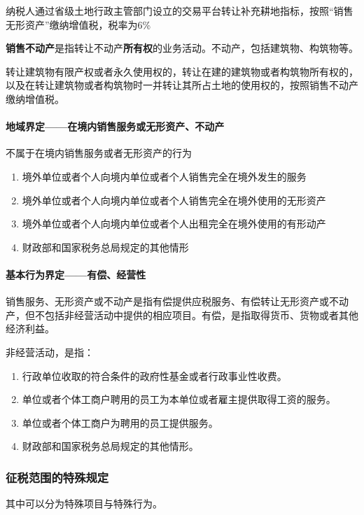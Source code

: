 \documentclass[UTF8,12pt]{ctexart}
\numberwithin{equation}{section} %
\numberwithin{figure}{section}
\numberwithin{table}{section}
\begin{document}
	纳税人通过省级土地行政主管部门设立的交易平台转让补充耕地指标，按照“销售无形资产”缴纳增值税，税率为6\%
	
	
	\textbf{销售不动产}是指转让不动产\textbf{所有权}的业务活动。不动产，包括建筑物、构筑物等。
	
	转让建筑物有限产权或者永久使用权的，转让在建的建筑物或者构筑物所有权的，以及在转让建筑物或者构筑物时一并转让其所占土地的使用权的，按照销售不动产缴纳增值税。
	
	\paragraph{地域界定——在境内销售服务或无形资产、不动产}
	不属于在境内销售服务或者无形资产的行为
	\begin{enumerate}
		\item 境外单位或者个人向境内单位或者个人销售完全在境外发生的服务
		
		\item 境外单位或者个人向境内单位或者个人销售完全在境外使用的无形资产
		
		\item 境外单位或者个人向境内单位或者个人出租完全在境外使用的有形动产
		
		\item 财政部和国家税务总局规定的其他情形
	\end{enumerate}
	
	
	\paragraph{基本行为界定——有偿、经营性}
	销售服务、无形资产或不动产是指有偿提供应税服务、有偿转让无形资产或不动产，但不包括非经营活动中提供的相应项目。有偿，是指取得货币、货物或者其他经济利益。
	
	非经营活动，是指：
	\begin{enumerate}
		\item 行政单位收取的符合条件的政府性基金或者行政事业性收费。
		
		\item 单位或者个体工商户聘用的员工为本单位或者雇主提供取得工资的服务。
		
		\item 单位或者个体工商户为聘用的员工提供服务。
		
		\item 财政部和国家税务总局规定的其他情形。
	\end{enumerate}
	
	\subsubsection{征税范围的特殊规定}
	其中可以分为特殊项目与特殊行为。
	
\end{document}
